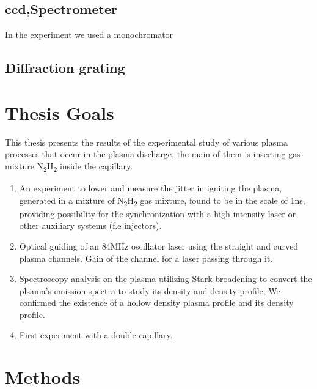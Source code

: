 \documentclass[nofonts]{tufte-book}
\begin{document}
		\section{ccd,Spectrometer}\label{sec:ccd}
In the experiment we used a monochromator

		\section{Diffraction grating}\label{sec:diffractiongrating}

		\chapter{Thesis Goals}\label{chap:goals}
This thesis presents the results of the experimental study of various plasma processes that occur in the plasma discharge, the main of them is inserting gas mixture N\textsubscript{2}H\textsubscript{2} inside the capillary.
\begin{enumerate}
  \item An experiment to lower and measure the jitter in igniting the plasma, generated in a mixture of N\textsubscript{2}H\textsubscript{2} gas mixture, found to be in the scale of 1ns, providing possibility for the synchronization with a high intensity laser or other auxiliary systems (f.e injectors).
  \item Optical guiding of an 84MHz oscillator laser using the straight and curved plasma channels. Gain of the channel for a laser passing through it.
  \item Spectroscopy analysis on the plasma utilizing Stark broadening to convert the plsama's emission spectra to study its density and density profile; We confirmed the existence of a hollow density plasma profile and its density profile.
  \item First experiment with a double capillary.
\end{enumerate}
	\chapter{Methods}\label{chap:methods}
\end{document}
